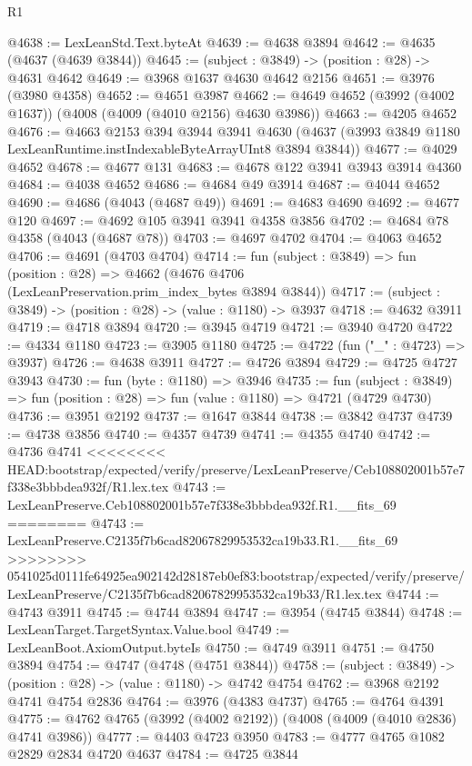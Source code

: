\begin{lexlean}{R1}
\begin{coremodule}
{{{{{{{{{{{{{{{{{{{{{{{{{{{{{{{{{{{{{{{{{{{{{{{{{{{{{{{{{{{{{{{{{{{{{{{{{{{{{{{{{{{{{{{{{{{{{{{{{{{{{{{{{{{{{{{{{{{{{{{{{{{{{{{{{{{{{{{{{{{{{{{{{{{{{{{{{{{{{{{{{{{{{{{{{{{{{{{{{{{{{{{{{{@4638 := LexLeanStd.Text.byteAt
@4639 := @4638 @3894
@4642 := @4635 (@4637 (@4639 @3844))
@4645 := (subject : @3849) -> (position : @28) -> @4631 @4642
@4649 := @3968 @1637 @4630 @4642 @2156
@4651 := @3976 (@3980 @4358)
@4652 := @4651 @3987
@4662 := @4649 @4652 (@3992 (@4002 @1637)) (@4008 (@4009 (@4010 @2156) @4630 @3986))
@4663 := @4205 @4652
@4676 := @4663
    @2153
    @394
    @3944
    @3941
    @4630
    (@4637 (@3993 @3849 @1180 LexLeanRuntime.instIndexableByteArrayUInt8 @3894 @3844))
@4677 := @4029 @4652
@4678 := @4677 @131
@4683 := @4678 @122 @3941 @3943 @3914 @4360
@4684 := @4038 @4652
@4686 := @4684 @49 @3914
@4687 := @4044 @4652
@4690 := @4686 (@4043 (@4687 @49))
@4691 := @4683 @4690
@4692 := @4677 @120
@4697 := @4692 @105 @3941 @3941 @4358 @3856
@4702 := @4684 @78 @4358 (@4043 (@4687 @78))
@4703 := @4697 @4702
@4704 := @4063 @4652
@4706 := @4691 (@4703 @4704)
@4714 := fun (subject : @3849) =>
  fun (position : @28) => @4662 (@4676 @4706 (LexLeanPreservation.prim_index_bytes @3894 @3844))
@4717 := (subject : @3849) -> (position : @28) -> (value : @1180) -> @3937
@4718 := @4632 @3911
@4719 := @4718 @3894
@4720 := @3945 @4719
@4721 := @3940 @4720
@4722 := @4334 @1180
@4723 := @3905 @1180
@4725 := @4722 (fun ("_" : @4723) => @3937)
@4726 := @4638 @3911
@4727 := @4726 @3894
@4729 := @4725 @4727 @3943
@4730 := fun (byte : @1180) => @3946
@4735 := fun (subject : @3849) => fun (position : @28) => fun (value : @1180) => @4721 (@4729 @4730)
@4736 := @3951 @2192
@4737 := @1647 @3844
@4738 := @3842 @4737
@4739 := @4738 @3856
@4740 := @4357 @4739
@4741 := @4355 @4740
@4742 := @4736 @4741
<<<<<<<< HEAD:bootstrap/expected/verify/preserve/LexLeanPreserve/Ceb108802001b57e7f338e3bbbdea932f/R1.lex.tex
@4743 := LexLeanPreserve.Ceb108802001b57e7f338e3bbbdea932f.R1.__fits_69
========
@4743 := LexLeanPreserve.C2135f7b6cad82067829953532ca19b33.R1.__fits_69
>>>>>>>> 0541025d0111fe64925ea902142d28187eb0ef83:bootstrap/expected/verify/preserve/LexLeanPreserve/C2135f7b6cad82067829953532ca19b33/R1.lex.tex
@4744 := @4743 @3911
@4745 := @4744 @3894
@4747 := @3954 (@4745 @3844)
@4748 := LexLeanTarget.TargetSyntax.Value.bool
@4749 := LexLeanBoot.AxiomOutput.byteIs
@4750 := @4749 @3911
@4751 := @4750 @3894
@4754 := @4747 (@4748 (@4751 @3844))
@4758 := (subject : @3849) -> (position : @28) -> (value : @1180) -> @4742 @4754
@4762 := @3968 @2192 @4741 @4754 @2836
@4764 := @3976 (@4383 @4737)
@4765 := @4764 @4391
@4775 := @4762 @4765 (@3992 (@4002 @2192)) (@4008 (@4009 (@4010 @2836) @4741 @3986))
@4777 := @4403 @4723 @3950
@4783 := @4777 @4765 @1082 @2829 @2834 @4720 @4637
@4784 := @4725 @3844
}}}}}}}}}}}}}}}}}}}}}}}}}}}}}}}}}}}}}}}}}}}}}}}}}}}}}}}}}}}}}}}}}}}}}}}}}}}}}}}}}}}}}}}}}}}}}}}}}}}}}}}}}}}}}}}}}}}}}}}}}}}}}}}}}}}}}}}}}}}}}}}}}}}}}}}}}}}}}}}}}}}}}}}}}}}}}}}}}}}}}}}}}}
\end{coremodule}
\end{lexlean}
